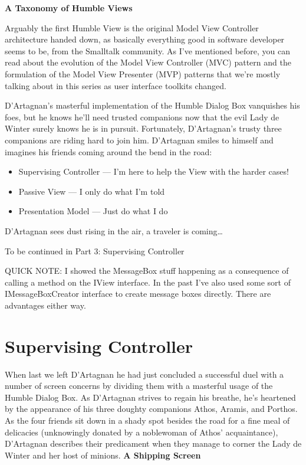 \documentclass{article}
\begin{document}
{ 
\Large {\textbf{A Taxonomy of Humble Views }}

Arguably the first Humble View is the original Model View Controller architecture handed down, as basically everything good in software developer seems to be, from the Smalltalk community.  As I've mentioned before, you can read about the evolution of the Model View Controller (MVC) pattern and the formulation of the Model View Presenter (MVP) patterns that we're mostly talking about in this series as user interface toolkits changed.

D'Artagnan's masterful implementation of the Humble Dialog Box vanquishes his foes, but he knows he'll need trusted companions now that the evil Lady de Winter surely knows he is in pursuit.  Fortunately, D'Artagnan's trusty three companions are riding hard to join him.  D'Artagnan smiles to himself and imagines his friends coming around the bend in the road:

 \begin{itemize}
 \item  Supervising Controller — I'm here to help the View with the harder cases!  \vspace{5pt}
 \item  Passive View — I only do what I'm told  \vspace{5pt}
 \item  Presentation Model — Just do what I do  \vspace{5pt}
  \end{itemize}
D'Artagnan sees dust rising in the air, a traveler is coming…

 

To be continued in Part 3:  Supervising Controller

     

QUICK NOTE:  I showed the MessageBox stuff happening as a consequence of calling a method on the IView interface.  In the past I've also used some sort of IMessageBoxCreator interface to create message boxes directly.  There are advantages either way.


\section{ Supervising Controller } 

When last we left D'Artagnan he had just concluded a successful duel with a number of screen concerns by dividing them with a masterful usage of the Humble Dialog Box.  As D'Artagnan strives to regain his breathe, he's heartened by the appearance of his three doughty companions Athos, Aramis, and Porthos.  As the four friends sit down in a shady spot besides the road for a fine meal of delicacies (unknowingly donated by a noblewoman of Athos' acquaintance), D'Artagnan describes their predicament when they manage to corner the Lady de Winter and her host of minions.
\Large {\textbf{A Shipping Screen }}

}
\end{document}
